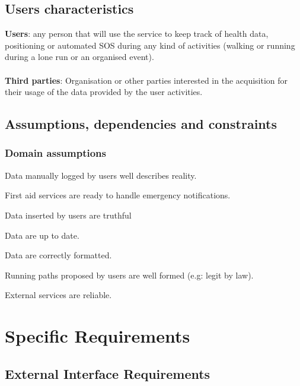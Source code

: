 \documentclass{article}
\begin{document}
\subsection{Users characteristics}
\textbf{Users}: any person that will use the service to keep track of health data, positioning or automated SOS during any kind of activities (walking or running during a lone run or an organised event).\\\\
\textbf{Third parties}: Organisation or other parties interested in the acquisition for their usage of the data provided by the user activities.

\subsection{Assumptions, dependencies and constraints}

\subsubsection{Domain assumptions}

\begin{enumerate}[label={[D\arabic*]}]
    	\item Data manually logged by users well describes reality.
    	\item First aid services are ready to handle emergency notifications.
    	\item Data inserted by users are truthful 
    		\begin{enumerate}[label={[D\arabic{enumi}.\arabic*]}]
    			\item Data are up to date.
    			\item Data are correctly formatted.
  			\end{enumerate}
  		
  		\item Running paths proposed by users are well formed (e.g: legit by law).
  		\item External services are reliable.
\end{enumerate}

\newpage
\section{Specific Requirements}

\subsection{External Interface Requirements}
\end{document}
